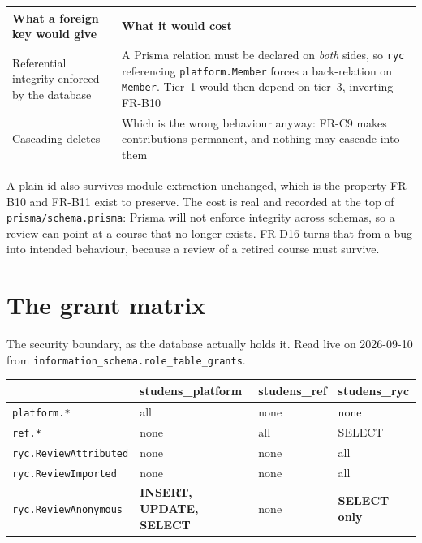 \documentclass[11pt,a4paper]{article}
\begin{document}
\begin{center}
\sffamily\small
\begin{tabular}{@{}p{4.6cm}p{9.4cm}@{}}
\toprule
\textbf{What a foreign key would give} & \textbf{What it would cost} \\
\midrule
Referential integrity enforced by the database & A Prisma relation must be declared on \emph{both} sides, so \texttt{ryc} referencing \texttt{platform.Member} forces a back-relation on \texttt{Member}. Tier~1 would then depend on tier~3, inverting FR-B10 \\[2mm]
Cascading deletes & Which is the wrong behaviour anyway: FR-C9 makes contributions permanent, and nothing may cascade into them \\
\bottomrule
\end{tabular}
\end{center}

A plain id also survives module extraction unchanged, which is the property
FR-B10 and FR-B11 exist to preserve. The cost is real and recorded at the top of
\texttt{prisma/schema.prisma}: Prisma will not enforce integrity across schemas,
so a review can point at a course that no longer exists. FR-D16 turns that from
a bug into intended behaviour, because a review of a retired course must
survive.

\newpage
\section{The grant matrix}

The security boundary, as the database actually holds it. Read live on
2026-09-10 from \texttt{information\_schema.role\_table\_grants}.

\begin{center}
\sffamily\scriptsize
\renewcommand{\arraystretch}{1.25}
\begin{tabular}{@{}p{4.7cm}p{2.9cm}p{2.9cm}p{2.9cm}@{}}
\toprule
& \textbf{\color{studens}studens\_platform} & \textbf{studens\_ref} & \textbf{studens\_ryc} \\
\midrule
\texttt{platform.*} & all & \textcolor{muted}{none} & \textcolor{muted}{none} \\
\texttt{ref.*} & \textcolor{muted}{none} & all & SELECT \\
\texttt{ryc.ReviewAttributed} & \textcolor{muted}{none} & \textcolor{muted}{none} & all \\
\texttt{ryc.ReviewImported} & \textcolor{muted}{none} & \textcolor{muted}{none} & all \\
\rowcolor{anonlt}
\texttt{ryc.ReviewAnonymous} & \textbf{INSERT, UPDATE, SELECT} & \textcolor{muted}{none} & \textbf{SELECT only} \\
\bottomrule
\end{tabular}
\end{center}
\end{document}
